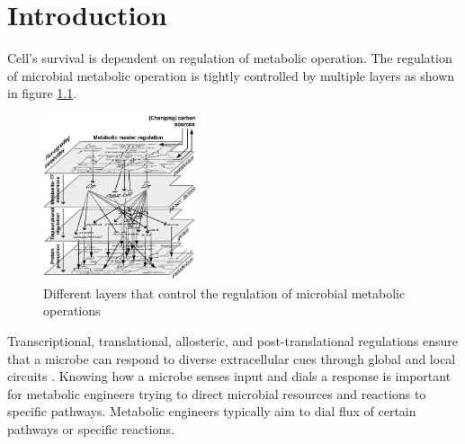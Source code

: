 \documentclass[12pt,chapterheads]{ucsd}
\begin{document}
%







%   
%   
%
\chapter{Introduction}
Cell's survival is dependent on regulation of metabolic operation.
The regulation of microbial metabolic operation is tightly controlled by multiple layers \cite{Kotte2010} as shown in figure \ref{fig:mlayers}. 
\begin{figure}[h] 
\centering
\includegraphics[width=0.4\textwidth]{metabolic_reg}
\caption[Different layers that control the regulation of microbial metabolic operations]
{Different layers that control the regulation of microbial metabolic operations}
\label{fig:mlayers}
\end{figure}
Transcriptional, translational, allosteric, and post-translational regulations ensure that a microbe can respond to diverse extracellular cues through global and local circuits \cite{Chubukov2014}. Knowing how a microbe senses input and dials a response is important for metabolic engineers trying to direct microbial resources and reactions to specific pathways. Metabolic engineers typically aim to dial flux of certain pathways or specific reactions.
\end{document}
